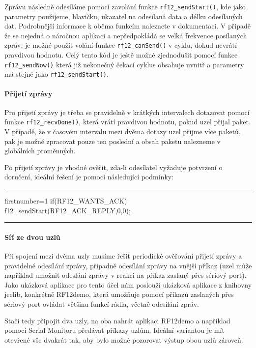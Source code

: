 \documentclass[12pt,titlepage]{article}
\newcommand{\codetitle}[1]{\bigskip \noindent {\scriptsize #1}\hrule}
\begin{document}
		Zprávu následně odesíláme pomocí zavolání funkce \texttt{rf12\_sendStart()}, kde jako parametry použijeme, hlavičku, ukazatel na odesílaná data a délku odesílaných dat. Podrobnější informace k oběma funkcím naleznete v dokumentaci. V případě že se nejedná o náročnou aplikaci a nepředpokládá se velká frekvence posílaných zpráv, je možné použít volání funkce \texttt{rf12\_canSend()} v cyklu, dokud nevrátí pravdivou hodnotu. Celý tento kód je ještě možné zjednodušit pomocí funkce \texttt{rf12\_sendNow()} která již nekonečný čekací cyklus obsahuje uvnitř a parametry má stejné jako \texttt{rf12\_sendStart()}.

		\paragraph{Přijetí zprávy}
		Pro přijetí zprávy je třeba se pravidelně v krátkých intervalech dotazovat pomocí funkce \texttt{rf12\_recvDone()}, která vrátí pravdivou hodnotu, pokud uzel přijal paket. V případě, že v časovém intervalu mezi dvěma dotazy uzel přijme více paketů, pak je možné zpracovat pouze ten poslední a obsah paketu nalezneme v globálních proměnných.

		Po přijetí zprávy  je vhodné ověřit, zda-li odesílatel vyžaduje potvrzení o doručení, ideální řešení je pomocí následující podmínky:


\codetitle{Ukázka podmínky pro odeslání ACK zprávy}
\begin{cppcode*}{firstnumber=1}
if(RF12_WANTS_ACK){
    f12_sendStart(RF12_ACK_REPLY,0,0);
}
\end{cppcode*}
\hrule
\bigskip

		\paragraph{Síť ze dvou uzlů}
        Při spojení mezi dvěma uzly musíme řešit periodické ověřování přijetí zprávy a pravidelné odesílání zprávy, případně odesílání zprávy na vnější příkaz (uzel může například umožnit odeslání zprávy v reakci na příkaz zaslaný přes sériový port). Jako ukázková aplikace pro tento účel nám poslouží ukázková aplikace z knihovny jeelib, konkrétně RF12demo, která umožňuje pomocí příkazů zaslaných přes sériový port ovládat většinu funkcí rádia, včetně odesílání zpráv.

        Stačí tedy připojit dva uzly, na oba nahrát aplikaci RF12demo a například pomocí Serial Monitoru předávat příkazy uzlům. Ideální variantou je mít otevřené vše dvakrát tak, aby bylo možné pozorovat výstup obou uzlů zároveň.
\end{document}
